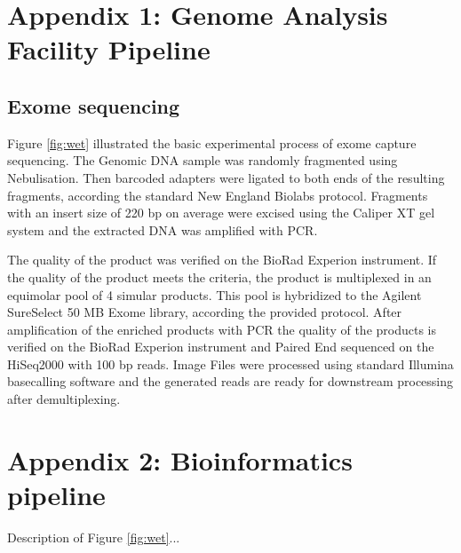 \documentclass[a4paper,12pt]{article}
\begin{document}
\clearpage
\section*{Appendix 1: Genome Analysis Facility Pipeline}
\subsection*{Exome sequencing}
\begin{wrapfigure}{r}{0.5\textwidth}
	\begin{center}
		\texttt{[image: \$\{gaffig]}}
	\end{center}
	\caption{Workflow in the lab}
	\label{fig:wet}
\end{wrapfigure}
Figure \ref{fig:wet} illustrated the basic experimental process of exome capture sequencing. The Genomic DNA sample was randomly fragmented using Nebulisation. Then barcoded adapters were ligated to both ends of the resulting fragments, according the standard New England Biolabs protocol. Fragments with an insert size of 220 bp on average were excised using the Caliper XT gel system and the extracted DNA was amplified with PCR.

The quality of the product was verified on the BioRad Experion instrument. If the quality of the product meets the criteria, the product is multiplexed in an equimolar pool of 4 simular products. This pool is hybridized to the Agilent SureSelect 50 MB Exome library, according the provided protocol. After amplification of the enriched products with PCR the quality of the products is verified on the BioRad Experion instrument and Paired End sequenced on the HiSeq2000 with 100 bp reads. Image Files were processed using standard Illumina basecalling software and the generated reads are ready for downstream processing after demultiplexing.

\section*{Appendix 2: Bioinformatics pipeline}
\begin{wrapfigure}{r}{0.5\textwidth}
	\begin{center}
		\texttt{[image: \$\{workflowpng]}}
	\end{center}
	\caption{Bioinformatics pipeline}
	\label{fig:dry}
\end{wrapfigure}
Description of Figure \ref{fig:wet}...
\end{document}
